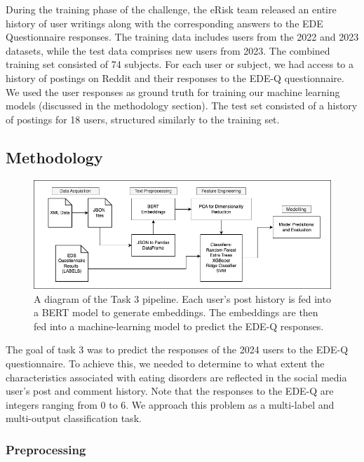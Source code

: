 \documentclass[]{style/ceurart}
\begin{document}
During the training phase of the challenge, the eRisk team released an entire history of user writings along with the corresponding answers to the EDE Questionnaire responses.
The training data includes users from the 2022 and 2023 datasets, while the test data comprises new users from 2023.
The combined training set consisted of 74 subjects.
For each user or subject, we had access to a history of postings on Reddit and their responses to the EDE-Q questionnaire.
We used the user responses as ground truth for training our machine learning models (discussed in the methodology section).
The test set consisted of a history of postings for 18 users, structured similarly to the training set.

\subsection{Methodology}

\begin{figure}[h]
  \centering
  \includegraphics[width=\textwidth]{Task3Pipeline.png}
  \caption{
    A diagram of the Task 3 pipeline.
    Each user's post history is fed into a BERT model to generate embeddings.
    The embeddings are then fed into a machine-learning model to predict the EDE-Q responses.
  }

  \label{fig:example}
\end{figure}

The goal of task 3 was to predict the responses of the 2024 users to the EDE-Q questionnaire.
To achieve this, we needed to determine to what extent the characteristics associated with eating disorders are reflected in the social media user's post and comment history.
Note that the responses to the EDE-Q are integers ranging from 0 to 6.
We approach this problem as a multi-label and multi-output classification task.

\subsubsection{Preprocessing}
\end{document}
